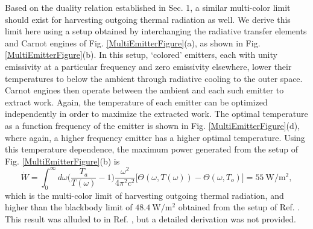 \documentclass[notitlepage,onecolumn,aps,showpacs,preprintnumbers,amsmath,amssymb,superscriptaddress]{revtex4-1}
\begin{document}
Based on the duality relation established in Sec. 1, a similar multi-color limit should exist for harvesting outgoing thermal radiation as well. We derive this limit here using a setup obtained by interchanging the radiative transfer elements and Carnot engines of Fig. \ref{MultiEmitterFigure}(a), as shown in Fig. \ref{MultiEmitterFigure}(b). In this setup, `colored' emitters, each with unity emissivity at a particular frequency and zero emissivity elsewhere, lower their temperatures to below the ambient through radiative cooling to the outer space. Carnot engines then operate between the ambient and each such emitter to extract work. Again, the temperature of each emitter can be optimized independently in order to maximize the extracted work. The optimal temperature as a function frequency of the emitter is shown in Fig. \ref{MultiEmitterFigure}(d), where again, a higher frequency emitter has a higher optimal temperature. Using this temperature dependence, the maximum power generated from the setup of Fig. \ref{MultiEmitterFigure}(b) is
\begin{equation}
\dot{W} = \int_0^\infty d\omega\Big(\frac{T_a}{T(\omega)}-1\Big)\frac{\omega^2}{4\pi^2c^2}\big[\Theta(\omega,T(\omega))-\Theta(\omega,T_o)\big] = 55 \ \mathrm{W/m^2}, \label{multitherm}
\end{equation}
which is the multi-color limit of harvesting outgoing thermal radiation, and higher than the blackbody limit of $48.4 \ \mathrm{W/m^2}$ obtained from the setup of Ref. \citep{capasso}. This result was alluded to in Ref. \citep{parthi}, but a detailed derivation was not provided.  \\
\end{document}
